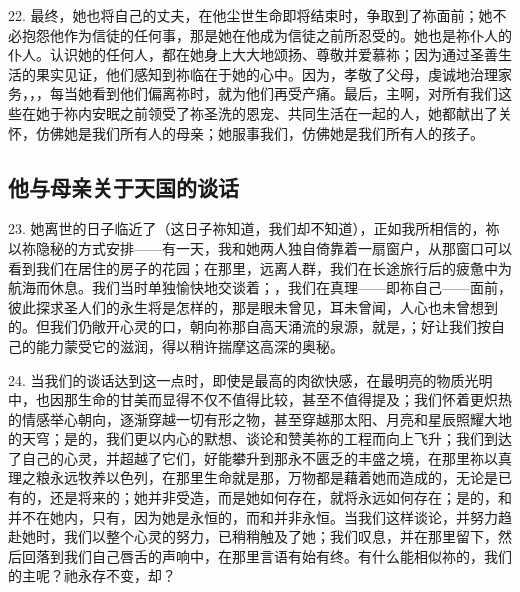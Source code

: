 22. 最终，她也将自己的丈夫，在他尘世生命即将结束时，争取到了祢面前；她不必抱怨他作为信徒的任何事，那是她在他成为信徒之前所忍受的。她也是祢仆人的仆人。认识她的任何人，都在她身上大大地颂扬、尊敬并爱慕祢；因为通过圣善生活的果实见证，他们感知到祢临在于她的心中。因为，孝敬了父母，虔诚地治理家务，，，每当她看到他们偏离祢时，就为他们再受产痛。最后，主啊，对所有我们这些在她于祢内安眠之前领受了祢圣洗的恩宠、共同生活在一起的人，她都献出了关怀，仿佛她是我们所有人的母亲；她服事我们，仿佛她是我们所有人的孩子。\par


\subsection{他与母亲关于天国的谈话}

23. 她离世的日子临近了（这日子祢知道，我们却不知道），正如我所相信的，祢以祢隐秘的方式安排——有一天，我和她两人独自倚靠着一扇窗户，从那窗口可以看到我们在居住的房子的花园；在那里，远离人群，我们在长途旅行后的疲惫中为航海而休息。我们当时单独愉快地交谈着；，我们在真理——即祢自己——面前，彼此探求圣人们的永生将是怎样的，那是眼未曾见，耳未曾闻，人心也未曾想到的。但我们仍敞开心灵的口，朝向祢那自高天涌流的泉源，就是，；好让我们按自己的能力蒙受它的滋润，得以稍许揣摩这高深的奥秘。\par

24. 当我们的谈话达到这一点时，即使是最高的肉欲快感，在最明亮的物质光明中，也因那生命的甘美而显得不仅不值得比较，甚至不值得提及；我们怀着更炽热的情感举心朝向，逐渐穿越一切有形之物，甚至穿越那太阳、月亮和星辰照耀大地的天穹；是的，我们更以内心的默想、谈论和赞美祢的工程而向上飞升；我们到达了自己的心灵，并超越了它们，好能攀升到那永不匮乏的丰盛之境，在那里祢以真理之粮永远牧养以色列，在那里生命就是那，万物都是藉着她而造成的，无论是已有的，还是将来的；她并非受造，而是她如何存在，就将永远如何存在；是的，和并不在她内，只有，因为她是永恒的，而和并非永恒。当我们这样谈论，并努力趋赴她时，我们以整个心灵的努力，已稍稍触及了她；我们叹息，并在那里留下，然后回落到我们自己唇舌的声响中，在那里言语有始有终。有什么能相似祢的，我们的主呢？祂永存不变，却？\par

